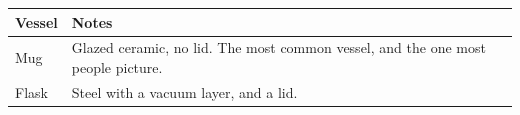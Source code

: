 \begin{tabular}{lp{5cm}}
    \toprule
    Vessel & Notes \\
    \midrule
    Mug & Glazed ceramic, no lid. The most common vessel, and the one most people picture. \\
    Flask & Steel with a vacuum layer, and a lid. \\
    \bottomrule
\end{tabular}
